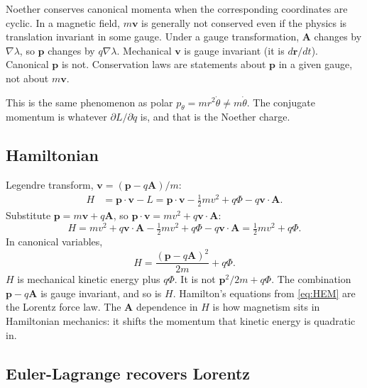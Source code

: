 \documentclass[11pt]{article}
\numberwithin{equation}{section}
\newcommand{\qdot}{\dot{q}}
\newcommand{\vect}[1]{\mathbf{#1}}
\begin{document}
Noether conserves canonical momenta when the corresponding coordinates are cyclic. In a magnetic field, $m\vect{v}$ is generally not conserved even if the physics is translation invariant in some gauge. Under a gauge transformation, $\vect{A}$ changes by $\nabla\lambda$, so $\vect{p}$ changes by $q\nabla\lambda$. Mechanical $\vect{v}$ is gauge invariant (it is $d\vect{r}/dt$). Canonical $\vect{p}$ is not. Conservation laws are statements about $\vect{p}$ in a given gauge, not about $m\vect{v}$.

This is the same phenomenon as polar $p_\theta=m r^2\dot\theta\neq m\dot\theta$. The conjugate momentum is whatever $\partial L/\partial\qdot$ is, and that is the Noether charge.

\subsection{Hamiltonian}

Legendre transform, $\vect{v}=(\vect{p}-q\vect{A})/m$:
\begin{align*}
H
&= \vect{p}\cdot\vect{v}-L
= \vect{p}\cdot\vect{v} - \tfrac12 m v^2 + q\Phi - q\vect{v}\cdot\vect{A}.
\end{align*}
Substitute $\vect{p}=m\vect{v}+q\vect{A}$, so $\vect{p}\cdot\vect{v}=m v^2+q\vect{v}\cdot\vect{A}$:
\[
H = m v^2 + q\vect{v}\cdot\vect{A} - \tfrac12 m v^2 + q\Phi - q\vect{v}\cdot\vect{A}
= \tfrac12 m v^2 + q\Phi.
\]
In canonical variables,
\begin{equation}
\label{eq:HEM}
H = \frac{(\vect{p}-q\vect{A})^2}{2m} + q\Phi.
\end{equation}
$H$ is mechanical kinetic energy plus $q\Phi$. It is not $\vect{p}^2/2m+q\Phi$. The combination $\vect{p}-q\vect{A}$ is gauge invariant, and so is $H$. Hamilton's equations from \eqref{eq:HEM} are the Lorentz force law. The $\vect{A}$ dependence in $H$ is how magnetism sits in Hamiltonian mechanics: it shifts the momentum that kinetic energy is quadratic in.

\subsection{Euler-Lagrange recovers Lorentz}
\end{document}

